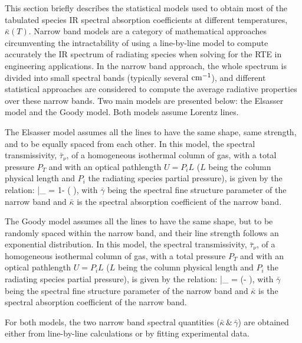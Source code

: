This section briefly describes the statistical models used to obtain most of the tabulated species IR spectral absorption coefficients at different temperatures, $\bar{\kappa}(T)$. Narrow band models are a category of mathematical approaches circumventing the intractability of using a line-by-line model to compute accurately the IR spectrum of radiating species when solving for the RTE in engineering applications. In the narrow band approach, the whole spectrum is divided into small spectral bands (typically several $\rm cm^{-1}$), and different statistical approaches are considered to compute the average radiative properties over these narrow bands. Two main models are presented below: the Elsasser model and the Goody model. Both models assume Lorentz lines.

The Elsasser model assumes all the lines to have the same shape, same strength, and to be equally spaced from each other. In this model, the spectral transmissivity, $\bar{\tau}_{\nu}$, of a homogeneous isothermal column of gas, with a total pressure $P_T$ and with an optical pathlength $U = P_i L$ ($L$ being the column physical length and $P_i$ the radiating species partial pressure), is given by the relation:
\be\label{eq::Elsasser}
    \bar{\tau}_{\nu} = 1- \erf \left(\displaystyle{}  \right),
\ee
with $\bar{\gamma}$ being the spectral fine structure parameter of the narrow band and $\bar{\kappa}$ is the spectral absorption coefficient of the narrow band.

The Goody model assumes all the lines to have the same shape, but to be randomly spaced within the narrow band, and their line strength follows an exponential distribution. In this model, the spectral transmissivity, $\bar{\tau}_{\nu}$, of a homogeneous isothermal column of gas, with a total pressure $P_T$ and with an optical pathlength $U = P_i L$ ($L$ being the column physical length and $P_i$ the radiating species partial pressure), is given by the relation:
\be\label{eq::Goody}
    \bar{\tau}_{\nu} = \exp\left(-\displaystyle{}
    {\displaystyle{}}\right),
\ee
with $\bar{\gamma}$ being the spectral fine structure parameter of the narrow band and $\bar{\kappa}$ is the spectral absorption coefficient of the narrow band.

For both models, the two narrow band spectral quantities ($\bar{\kappa} \,\&\, \bar{\gamma}$) are obtained either from line-by-line calculations or by fitting experimental data.

